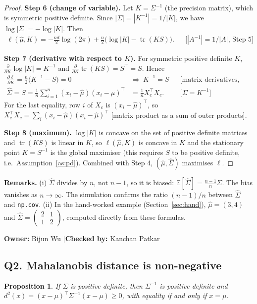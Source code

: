 \documentclass[11pt]{article}
\newtheorem{proposition}[theorem]{Proposition}
\theoremstyle{definition}
\newcommand{\T}{^{\top}}
\newcommand{\tr}{\operatorname{tr}}
\newcommand{\E}{\mathbb{E}}
\newcommand{\rul}[1]{\text{[#1]}}
\newcommand{\owner}[2]{\par\medskip\noindent\textbf{Owner:} #1 \quad$|$\quad \textbf{Checked by:} #2\par\medskip}
\begin{document}
\begin{proof}
\textbf{Step 6 (change of variable).} Let $K=\Sigma^{-1}$ (the precision matrix), which is symmetric positive definite. Since $|\Sigma|=|K^{-1}|=1/|K|$, we have $\log|\Sigma|=-\log|K|$. Then
\begin{align*}
\ell(\hat\mu,K)=-\frac{nd}{2}\log(2\pi)+\frac n2\Big(\log|K|-\tr(KS)\Big). && \rul{$|A^{-1}|=1/|A|$, Step 5}
\end{align*}

\textbf{Step 7 (derivative with respect to $K$).} For symmetric positive definite $K$, $\frac{\partial}{\partial K}\log|K|=K^{-1}$ and $\frac{\partial}{\partial K}\tr(KS)=S\T=S$. Hence
\begin{align*}
\frac{\partial\ell}{\partial K}=\frac n2\big(K^{-1}-S\big)=0 \ &\Longrightarrow\ K^{-1}=S && \rul{matrix derivatives, first-order condition}\\
\hat\Sigma=S=\frac1n\sum_{i=1}^n(x_i-\hat\mu)(x_i-\hat\mu)\T&=\frac1n X_c\T X_c. && \rul{$\Sigma=K^{-1}$}
\end{align*}
For the last equality, row $i$ of $X_c$ is $(x_i-\hat\mu)\T$, so $X_c\T X_c=\sum_i(x_i-\hat\mu)(x_i-\hat\mu)\T$ [matrix product as a sum of outer products].

\textbf{Step 8 (maximum).} $\log|K|$ is concave on the set of positive definite matrices and $\tr(KS)$ is linear in $K$, so $\ell(\hat\mu,K)$ is concave in $K$ and the stationary point $K=S^{-1}$ is the global maximiser (this requires $S$ to be positive definite, i.e.\ Assumption~\ref{as:pd}). Combined with Step 4, $(\hat\mu,\hat\Sigma)$ maximises $\ell$.
\end{proof}

\noindent\textbf{Remarks.} (i) $\hat\Sigma$ divides by $n$, not $n-1$, so it is biased: $\E[\hat\Sigma]=\frac{n-1}{n}\Sigma$. The bias vanishes as $n\to\infty$. The simulation confirms the ratio $(n-1)/n$ between $\hat\Sigma$ and \texttt{np.cov}. (ii) In the hand-worked example (Section~\ref{sec:hand}), $\hat\mu=(3,4)$ and $\hat\Sigma=\begin{pmatrix}2&1\\1&2\end{pmatrix}$, computed directly from these formulas.
\owner{Bijun Wu}{Kanchan Patkar}

\subsection*{Q2. Mahalanobis distance is non-negative}
\begin{proposition}\label{prop:nonneg}
If $\Sigma$ is positive definite, then $\Sigma^{-1}$ is positive definite and $d^2(x)=(x-\mu)\T\Sigma^{-1}(x-\mu)\ge0$, with equality if and only if $x=\mu$.
\end{proposition}
\end{document}
